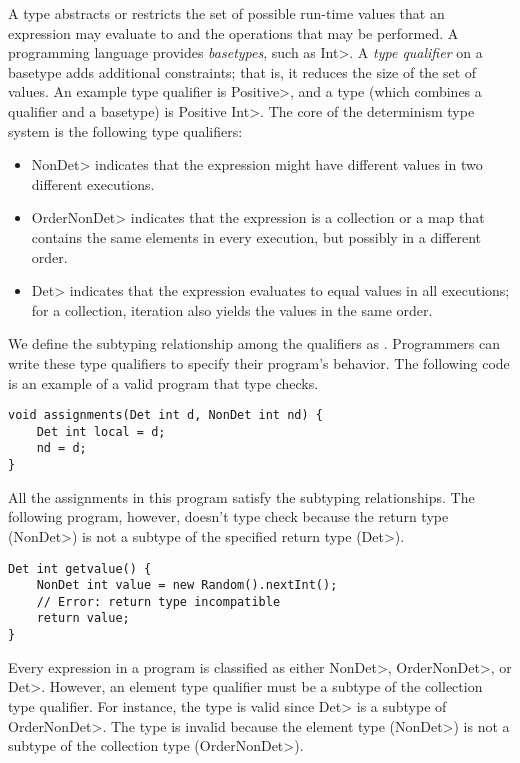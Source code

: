 A type abstracts or restricts the set of possible
run-time values that an expression may evaluate to and the operations that may be performed.
A programming language provides \emph{basetypes}, such as \<Int>.
A \textit{type qualifier} on a basetype adds additional constraints;
that is, it reduces the size of the set of values.
An example type qualifier is \<Positive>, and a type (which combines a qualifier
and a basetype) is \<Positive Int>.
The core of the determinism type system
is the following type qualifiers:
\begin{itemize}
    \item \<NonDet> indicates
    that the expression might have different values in two different executions.
    \item \<OrderNonDet> indicates that the expression is a collection or
    a map that contains the same elements in every execution, but possibly
    in a different order.
    \item \<Det> indicates that the expression evaluates to equal values in
    all executions; for a collection, iteration
    also yields the values in the same order.
\end{itemize}
We define the subtyping relationship among the qualifiers as .
Programmers can write these type qualifiers to specify their program's behavior. 
The following code is an example of a valid program that type checks. 
\begin{Verbatim}
void assignments(Det int d, NonDet int nd) {
    Det int local = d;
    nd = d;
}
\end{Verbatim}
All the assignments in this program 
satisfy the subtyping relationships. The following program, however, doesn't type check because the return
type (\<NonDet>) is not a subtype of the specified return type (\<Det>).
\begin{Verbatim}
Det int getvalue() {
    NonDet int value = new Random().nextInt();
    // Error: return type incompatible
    return value;
}
\end{Verbatim}

Every expression in a program is classified as either \<NonDet>, \<OrderNonDet>, or  \<Det>.
However, an element type qualifier must be a subtype of the collection type qualifier.
For instance, the type  is valid since \<Det> is a subtype of
\<OrderNonDet>. The type  is invalid because the element type
(\<NonDet>) is not a subtype of the collection type (\<OrderNonDet>).


